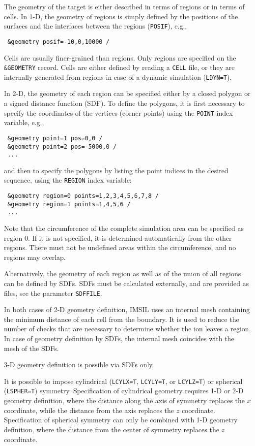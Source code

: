 The geometry of the target is either described in terms of regions or in terms 
of cells. In 1-D, the geometry of regions is simply defined by the positions of 
the surfaces and the interfaces between the regions (\texttt{POSIF}), e.g.,
%
\begin{verbatim}
 &geometry posif=-10,0,10000 /
\end{verbatim}
%
Cells are usually finer-grained than regions. Only regions are specified on the
\texttt{\&GEOMETRY} record. Cells are either defined by reading a \texttt{CELL}
file, or they are internally generated from regions in case of a dynamic
simulation (\texttt{LDYN=T}).

In 2-D, the geometry of each region can be specified either by a closed polygon 
or a signed distance function (SDF). To define the polygons, it is first 
necessary to specify the coordinates of the vertices (corner points) using the 
\texttt{POINT} index variable, e.g.,
%
\begin{verbatim}
 &geometry point=1 pos=0,0 /
 &geometry point=2 pos=-5000,0 /
 ...
\end{verbatim}
%
and then to specify the polygons by listing the point indices in the desired
sequence, using the \texttt{REGION} index variable:
%
\begin{verbatim}
 &geometry region=0 points=1,2,3,4,5,6,7,8 /
 &geometry region=1 points=1,4,5,6 /
 ...
\end{verbatim}
%
Note that the circumference of the complete simulation area can be specified as
region 0. If it is not specified, it is determined automatically from the
other regions. There must not be undefined areas within the circumference, and 
no regions may overlap.

Alternatively, the geometry of each region as well as of the union of all
regions can be defined by SDFs. SDFs must be calculated externally, and are
provided as files, see the parameter \texttt{SDFFILE}.

In both cases of 2-D geometry definition, IMSIL uses an internal mesh 
containing the minimum distance of each cell from the boundary. It is used to 
reduce the number of checks that are necessary to determine whether the ion 
leaves a region. In case of geometry definition by SDFs, the internal mesh
coincides with the mesh of the SDFs.

3-D geometry definition is possible via SDFs only.

It is possible to impose cylindrical (\texttt{LCYLX=T}, \texttt{LCYLY=T}, or
\texttt{LCYLZ=T}) or spherical (\texttt{LSPHER=T}) symmetry. Specification of
cylindrical geometry requires 1-D or 2-D geometry definition, where the 
distance along the axis of symmetry replaces the $x$ coordinate,
while the distance from the axis replaces the $z$ coordinate. Specification of
spherical symmetry can only be combined with 1-D geometry definition, where 
the distance from the center of symmetry replaces the $z$ coordinate. 

